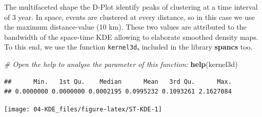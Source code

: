 \documentclass[
]{article}
\newenvironment{Shaded}{\begin{snugshade}}{\end{snugshade}}
\newcommand{\CommentTok}[1]{\textcolor[rgb]{0.56,0.35,0.01}{\textit{#1}}}
\newcommand{\DecValTok}[1]{\textcolor[rgb]{0.00,0.00,0.81}{#1}}
\newcommand{\FunctionTok}[1]{\textcolor[rgb]{0.13,0.29,0.53}{\textbf{#1}}}
\newcommand{\NormalTok}[1]{#1}
\newcommand{\OtherTok}[1]{\textcolor[rgb]{0.56,0.35,0.01}{#1}}
\newcommand{\SpecialCharTok}[1]{\textcolor[rgb]{0.81,0.36,0.00}{\textbf{#1}}}
\begin{document}
The multifaceted shape the D-Plot identify peaks of clustering at a time interval of 3 year.
In space, events are clustered at every distance, so in this case we use the maximum distance-value (10 km).
These two values are attributed to the bandwidth of the space-time KDE allowing to elaborate smoothed density maps.
To this end, we use the function \texttt{kernel3d}\textbf{,} included in the library \textbf{spancs} \citep{Rowlingson_2024} too.

\begin{Shaded}
\begin{Highlighting}[]
\CommentTok{\# Open the help to analyse the parameter of this function: }
\FunctionTok{help}\NormalTok{(kernel3d)}
\end{Highlighting}
\end{Shaded}

\begin{Shaded}
\end{Shaded}

\begin{verbatim}
##      Min.   1st Qu.    Median      Mean   3rd Qu.      Max. 
## 0.0000000 0.0000000 0.0002195 0.0995232 0.1093261 2.1627084
\end{verbatim}

\begin{Shaded}
\end{Shaded}

\begin{center}\texttt{[image: 04-KDE\_files/figure-latex/ST-KDE-1]} \end{center}
\end{document}
